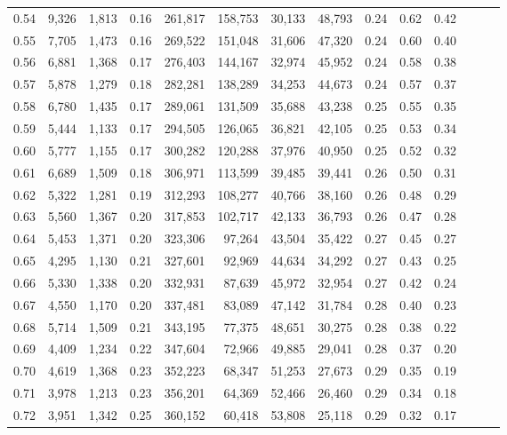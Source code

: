 \begin{tabular}{rrrrrrrrrrrrrr}
0.54 &  9,326 &  1,813 &  0.16 &  261,817 &  158,753 &  30,133 &  48,793 &  0.24 &  0.62 &      0.42 \\
0.55 &  7,705 &  1,473 &  0.16 &  269,522 &  151,048 &  31,606 &  47,320 &  0.24 &  0.60 &      0.40 \\
0.56 &  6,881 &  1,368 &  0.17 &  276,403 &  144,167 &  32,974 &  45,952 &  0.24 &  0.58 &      0.38 \\
0.57 &  5,878 &  1,279 &  0.18 &  282,281 &  138,289 &  34,253 &  44,673 &  0.24 &  0.57 &      0.37 \\
0.58 &  6,780 &  1,435 &  0.17 &  289,061 &  131,509 &  35,688 &  43,238 &  0.25 &  0.55 &      0.35 \\
0.59 &  5,444 &  1,133 &  0.17 &  294,505 &  126,065 &  36,821 &  42,105 &  0.25 &  0.53 &      0.34 \\
0.60 &  5,777 &  1,155 &  0.17 &  300,282 &  120,288 &  37,976 &  40,950 &  0.25 &  0.52 &      0.32 \\
0.61 &  6,689 &  1,509 &  0.18 &  306,971 &  113,599 &  39,485 &  39,441 &  0.26 &  0.50 &      0.31 \\
0.62 &  5,322 &  1,281 &  0.19 &  312,293 &  108,277 &  40,766 &  38,160 &  0.26 &  0.48 &      0.29 \\
0.63 &  5,560 &  1,367 &  0.20 &  317,853 &  102,717 &  42,133 &  36,793 &  0.26 &  0.47 &      0.28 \\
0.64 &  5,453 &  1,371 &  0.20 &  323,306 &   97,264 &  43,504 &  35,422 &  0.27 &  0.45 &      0.27 \\
0.65 &  4,295 &  1,130 &  0.21 &  327,601 &   92,969 &  44,634 &  34,292 &  0.27 &  0.43 &      0.25 \\
0.66 &  5,330 &  1,338 &  0.20 &  332,931 &   87,639 &  45,972 &  32,954 &  0.27 &  0.42 &      0.24 \\
0.67 &  4,550 &  1,170 &  0.20 &  337,481 &   83,089 &  47,142 &  31,784 &  0.28 &  0.40 &      0.23 \\
0.68 &  5,714 &  1,509 &  0.21 &  343,195 &   77,375 &  48,651 &  30,275 &  0.28 &  0.38 &      0.22 \\
0.69 &  4,409 &  1,234 &  0.22 &  347,604 &   72,966 &  49,885 &  29,041 &  0.28 &  0.37 &      0.20 \\
0.70 &  4,619 &  1,368 &  0.23 &  352,223 &   68,347 &  51,253 &  27,673 &  0.29 &  0.35 &      0.19 \\
0.71 &  3,978 &  1,213 &  0.23 &  356,201 &   64,369 &  52,466 &  26,460 &  0.29 &  0.34 &      0.18 \\
0.72 &  3,951 &  1,342 &  0.25 &  360,152 &   60,418 &  53,808 &  25,118 &  0.29 &  0.32 &      0.17 \\

\end{tabular}
